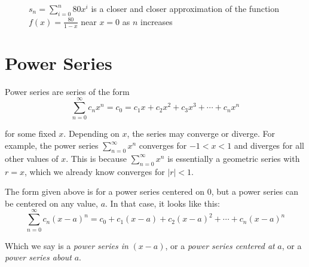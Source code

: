 \begin{figure}[htbp]
\centering
    \caption{$s_n = \sum_{i=0}^n 80x^i$ is a closer and closer approximation of 
    the function $f(x) = \frac{80}{1-x}$ near $x = 0$ as $n$ increases}
    \label{fig:taylorapprox}
\end{figure}

\section{Power Series}
Power series are series of the form 
$$\sum_{n=0}^\infty c_n x^n = c_0 = c_1 x + c_2 x^2 + c_3 x^3 + \cdots + c_n 
x^n$$

for some fixed $x$. Depending on $x$, the series may converge or diverge. For 
example, the power series $\sum_{n=0}^\infty x^n$ converges for $ -1 < x < 1$ 
and diverges for all other values of $x$. This is because $\sum_{n=0}^\infty 
x^n$ is essentially a geometric series with $r = x$, which we already know 
converges for $|r|<1$. 

The form given above is for a power series centered on $0$, but a power series 
can be centered on any value, $a$. In that case, it looks like this:
$$\sum_{n=0}^\infty c_n (x - a)^n = c_0 + c_1(x - a) + c_2(x - a)^2 + \cdots + 
c_n(x - a)^n$$

Which we say is a \textit{power series in }$(x - a)$, or a \textit{power 
series centered at }$a$, or a \textit{power series about }$a$. 

